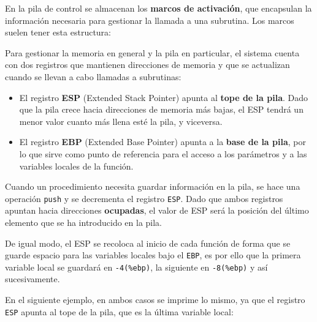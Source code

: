 \documentclass[11pt]{scrartcl}
\begin{document}
En la pila de control se almacenan los \textbf{marcos de activación}, que
encapsulan la información necesaria para gestionar la llamada a una
subrutina. Los marcos suelen tener esta estructura:

\begin{center}
  \begin{drawstackbare}
     
     \ebp
     
     
      \esp
  \end{drawstackbare}
\end{center}

Para gestionar la memoria en general y la pila en particular, el sistema cuenta
con dos registros que mantienen direcciones de memoria y que se actualizan
cuando se llevan a cabo llamadas a subrutinas:

\begin{itemize}
\item El registro \textbf{ESP} (Extended Stack Pointer) apunta al \textbf{tope
    de la pila}. Dado que la pila crece hacia direcciones de memoria más bajas,
  el ESP tendrá un menor valor cuanto más llena esté la pila, y viceversa.
\item El registro \textbf{EBP} (Extended Base Pointer) apunta a la \textbf{base
    de la pila}, por lo que sirve como punto de referencia para el acceso a los
  parámetros y a las variables locales de la función.
\end{itemize}

Cuando un procedimiento necesita guardar información en la pila, se hace una
operación \texttt{push} y se decrementa el registro \texttt{ESP}. Dado que ambos
registros apuntan hacia direcciones \textbf{ocupadas}, el valor de ESP será la
posición del último elemento que se ha introducido en la pila.

De igual modo, el ESP se recoloca al inicio de cada función de forma que se
guarde espacio para las variables locales bajo el \texttt{EBP}, es por ello que
la primera variable local se guardará en \texttt{-4(\%ebp)}, la siguiente en
\texttt{-8(\%ebp)} y así sucesivamente.

En el siguiente ejemplo, en ambos casos se imprime lo mismo, ya que el registro
\texttt{ESP} apunta al tope de la pila, que es la última variable local:
\end{document}
